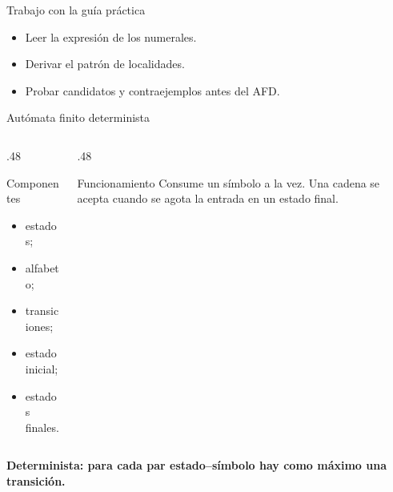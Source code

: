 \documentclass[11pt,spanish]{beamer}
\newcommand{\term}[1]{\textbf{\textcolor{indiagreen!80!black}{#1}}}
\newcommand{\actividad}[1]{\textbf{\textcolor{Rojo}{#1}}}
\begin{document}
\begin{frame}{Trabajo con la guía práctica}
\vfill
\begin{center}
\end{center}
\bigskip
\begin{itemize}
  \item Leer la expresión de los numerales.
  \item Derivar el patrón de localidades.
  \item Probar candidatos y contraejemplos antes del AFD.
\end{itemize}
\vfill
\end{frame}

\begin{frame}{Autómata finito determinista}
\vfill

\begin{columns}[T,onlytextwidth]
\begin{column}{.48\textwidth}
\begin{block}{Componentes}
\begin{itemize}
  \item estados;
  \item alfabeto;
  \item transiciones;
  \item estado inicial;
  \item estados finales.
\end{itemize}
\end{block}
\end{column}
\begin{column}{.48\textwidth}
\begin{block}{Funcionamiento}
Consume un símbolo a la vez. Una cadena se acepta cuando se agota la entrada en un estado final.
\end{block}
\end{column}
\end{columns}

\bigskip

\term{Determinista: para cada par estado--símbolo hay como máximo una transición.}

\vfill
\end{frame}
\end{document}
